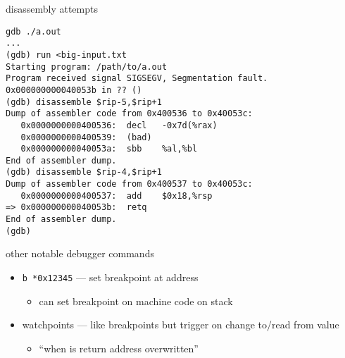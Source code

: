 \begin{frame}[fragile,label=badDisass]{disassembly attempts}
\begin{Verbatim}[fontsize=\fontsize{10}{11}\selectfont]
gdb ./a.out
...
(gdb) run <big-input.txt
Starting program: /path/to/a.out 
Program received signal SIGSEGV, Segmentation fault.
0x000000000040053b in ?? ()
(gdb) disassemble $rip-5,$rip+1
Dump of assembler code from 0x400536 to 0x40053c:
   0x0000000000400536:  decl   -0x7d(%rax)
   0x0000000000400539:  (bad)  
   0x000000000040053a:  sbb    %al,%bl
End of assembler dump.
(gdb) disassemble $rip-4,$rip+1
Dump of assembler code from 0x400537 to 0x40053c:
   0x0000000000400537:  add    $0x18,%rsp
=> 0x000000000040053b:  retq   
End of assembler dump.
(gdb)
\end{Verbatim}
\end{frame}

\begin{frame}[fragile,label=otherAss]{other notable debugger commands}
\begin{itemize}
\item \texttt{b *0x12345} --- set breakpoint at address
    \begin{itemize}
    \item can set breakpoint on machine code on stack
    \end{itemize}
\item watchpoints --- like breakpoints but trigger on change to/read from value
    \begin{itemize}
    \item ``when is return address overwritten''
    \end{itemize}
\end{itemize}
\end{frame}

